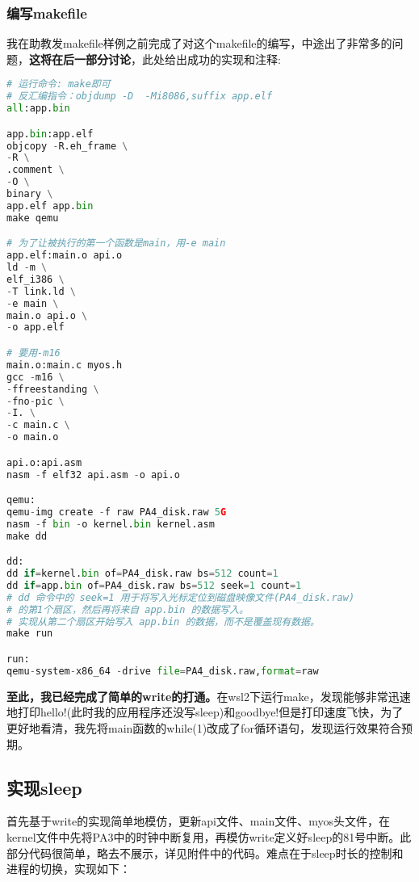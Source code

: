 \documentclass{LabReport}
\begin{document}
	\subsubsection{编写makefile}
	我在助教发makefile样例之前完成了对这个makefile的编写，中途出了非常多的问题，\textbf{这将在后一部分讨论}，此处给出成功的实现和注释:
\begin{lstlisting}[language=python,frame=shadowbox]
# 运行命令: make即可
# 反汇编指令：objdump -D  -Mi8086,suffix app.elf
all:app.bin

app.bin:app.elf
objcopy -R.eh_frame \
-R \
.comment \
-O \
binary \
app.elf app.bin
make qemu

# 为了让被执行的第一个函数是main，用-e main
app.elf:main.o api.o 
ld -m \
elf_i386 \
-T link.ld \
-e main \
main.o api.o \
-o app.elf 

# 要用-m16
main.o:main.c myos.h
gcc -m16 \
-ffreestanding \
-fno-pic \
-I. \
-c main.c \
-o main.o

api.o:api.asm
nasm -f elf32 api.asm -o api.o

qemu:
qemu-img create -f raw PA4_disk.raw 5G
nasm -f bin -o kernel.bin kernel.asm
make dd

dd:
dd if=kernel.bin of=PA4_disk.raw bs=512 count=1
dd if=app.bin of=PA4_disk.raw bs=512 seek=1 count=1
# dd 命令中的 seek=1 用于将写入光标定位到磁盘映像文件(PA4_disk.raw)
# 的第1个扇区，然后再将来自 app.bin 的数据写入。
# 实现从第二个扇区开始写入 app.bin 的数据，而不是覆盖现有数据。
make run

run:
qemu-system-x86_64 -drive file=PA4_disk.raw,format=raw 
\end{lstlisting}

\textbf{至此，我已经完成了简单的write的打通。}在wsl2下运行make，发现能够非常迅速地打印hello!(此时我的应用程序还没写sleep)和goodbye!但是打印速度飞快，为了更好地看清，我先将main函数的while(1)改成了for循环语句，发现运行效果符合预期。

	\subsection{实现sleep}
	首先基于write的实现简单地模仿，更新api文件、main文件、myos头文件，在kernel文件中先将PA3中的时钟中断复用，再模仿write定义好sleep的81号中断。此部分代码很简单，略去不展示，详见附件中的代码。难点在于sleep时长的控制和进程的切换，实现如下：
	
\end{document}
